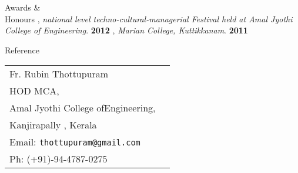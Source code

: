 \documentclass{resume}
\begin{document}

\begin{category}{Awards \&\\ Honours}
  , {\em national level techno-cultural-managerial Festival held at Amal Jyothi College of Engineering}. \hfill \textbf{2012}
  , {\em Marian College, Kuttikkanam}. \hfill \textbf{2011}
  
\end{category}





\begin{category}{Reference}
  \citemnobullet \\
  \begin{tabular}{ll}Fr. Rubin Thottupuram\\
    HOD MCA, \\
    Amal Jyothi College ofEngineering,\\
    Kanjirapally , Kerala\\
    Email: \mbox{\small\tt thottupuram@gmail.com}\\
    Ph: (+91)-94-4787-0275
  \end{tabular}
\end{category}
\end{document}
